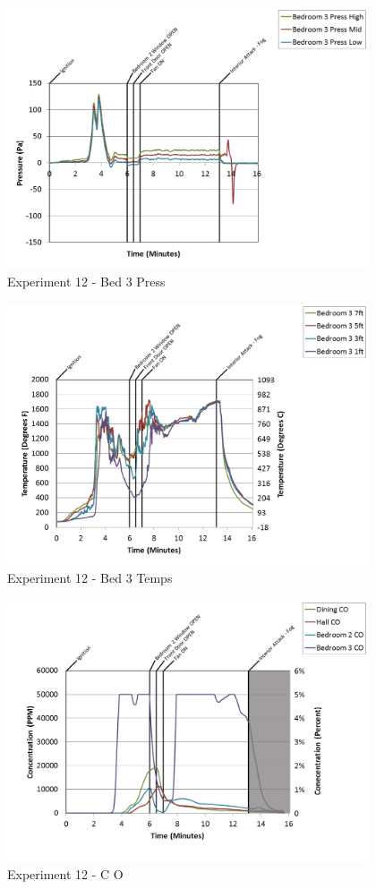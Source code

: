 \documentclass{article}
\begin{document}
\begin{appendices}
\begin{figure}[h!]
	\centering
	\includegraphics[height=3.05in]{0_Images/Results_Charts/Exp_12_Charts/Bed3Press.png}
	\caption{Experiment 12 - Bed 3 Press}
\end{figure}

\clearpage

\begin{figure}[h!]
	\centering
	\includegraphics[height=3.05in]{0_Images/Results_Charts/Exp_12_Charts/Bed3Temps.png}
	\caption{Experiment 12 - Bed 3 Temps}
\end{figure}


\begin{figure}[h!]
	\centering
	\includegraphics[height=3.05in]{0_Images/Results_Charts/Exp_12_Charts/CO.png}
	\caption{Experiment 12 - C O}
\end{figure}


\end{appendices}
\end{document}
